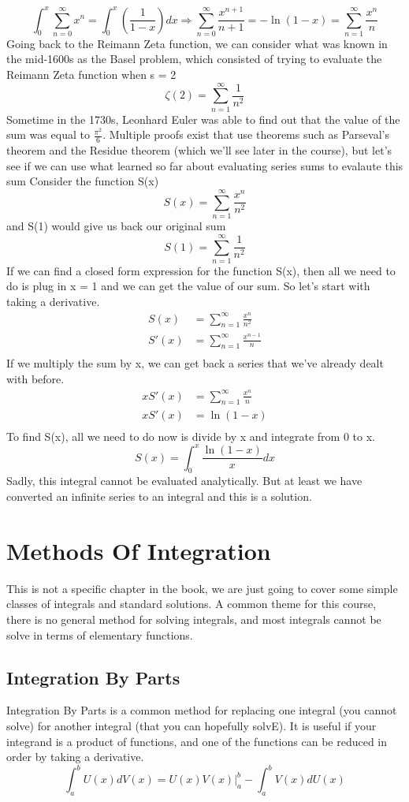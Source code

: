 \documentclass{article}
\newcommand{\be}{\begin{equation}}
\newcommand{\ee}{\end{equation}}
\newcommand{\sumzero}{\sum_{n=0}^\infty}
\newcommand{\sumone}{\sum_{n=1}^\infty}
\begin{document}
\be
\int_{0}^{x} \sumzero x^n = \int_{0}^{x} \left( \frac{1}{1 - x} \right) dx \Rightarrow \sum_{n = 0}^{\infty} \frac{x^{n + 1}}{n + 1} =  - \ln(1 - x) = \sumone \frac{x^n}{n}
\ee
Going back to the Reimann Zeta function, we can consider what was known in the mid-1600s as the Basel problem, which consisted of trying to evaluate the Reimann Zeta function when s = 2
\be
\zeta(2) = \sum_{n=1}^\infty \frac{1}{n^2}
\ee
Sometime in the 1730s, Leonhard Euler was able to find out that the value of the sum was equal to $\frac{\pi^2}{6}$.
Multiple proofs exist that use theorems such as Parseval's theorem and the Residue theorem (which we'll see later in the course), but let's see if we can use what learned so far about evaluating series sums to evalaute this sum
Consider the function S(x)
\be
S(x) = \sum_{n=1}^\infty \frac{x^n}{n^2}
\ee
and S(1) would give us back our original sum
\be
S(1) = \sum_{n=1}^\infty \frac{1}{n^2}
\ee
If we can find a closed form expression for the function S(x), then all we need to do is plug in x = 1 and we can get the value of our sum. So let's start with taking a derivative.
\be
\begin{split}
	S(x) &= \sum_{n=1}^\infty \frac{x^n}{n^2}\\
	S'(x) &= \sum_{n=1}^\infty \frac{x^{n-1}}{n}\\
\end{split}
\ee
If we multiply the sum by x, we can get back a series that we've already dealt with before.
\be
\begin{split}
	x S'(x) &= \sum_{n=1}^\infty \frac{x^{n}}{n}\\
	x S'(x) &= \ln(1-x)\\
\end{split}
\ee
To find S(x), all we need to do now is divide by x and integrate from 0 to x.
\be
	S(x) = \int_0^x \frac{\ln(1-x)}{x} dx
\ee
Sadly, this integral cannot be evaluated analytically.
But at least we have converted an infinite series to an integral and this is a solution.
\section*{Methods Of Integration}
This is not a specific chapter in the book, we are just going to cover some simple classes of integrals and standard solutions.
A common theme for this course, there is no general method for solving integrals, and most integrals cannot be solve in terms of elementary functions.

\subsection*{Integration By Parts}
Integration By Parts is a common method for replacing one integral (you cannot solve) for another integral (that you can hopefully solvE).
It is useful if your integrand is a product of functions, and one of the functions can be reduced in order by taking a derivative.
\be
\int_a^b U(x) dV(x) = U(x) V(x) \bigg | _a^b - \int_a^b V(x) dU(x)
\ee
\end{document}
